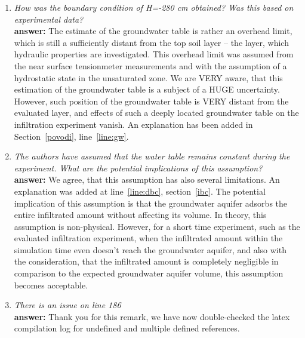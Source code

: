 \documentclass[final,3p, 11pt, a4paper]{elsarticle}
\begin{document}
\begin{enumerate}
\item {\it How was the boundary condition of H=-280 cm obtained? Was this based on experimental data?} \\
{\bf  answer:} The estimate of the groundwater table is rather an overhead limit, which is still a sufficiently distant from the top soil layer -- the layer, which hydraulic properties are investigated. This overhead limit was assumed from the near surface tensionmeter measurements and with the assumption of a hydrostatic state in the unsaturated zone. We are VERY aware, that this estimation of the groundwater table is a subject of a HUGE uncertainty. However, such position of the groundwater table is VERY distant from the evaluated layer, and effects of such a deeply located  groundwater table on the infiltration experiment vanish. An explanation has been added in Section~\ref{povodi}, line~\ref{line:gw}.
\item {\it   The authors have assumed that the water table remains constant during the experiment. What are the potential implications of this assumption?} \\
{\bf  answer:} We agree, that this assumption has also several limitations. An explanation was added at line~\ref{line:dbc}, section~\ref{ibc}. The potential implication of this assumption is that the groundwater aquifer adsorbs the entire infiltrated amount without affecting its volume. In theory, this assumption is non-physical. However, for a short time experiment, such as the evaluated infiltration experiment, when the infiltrated amount within the simulation time even doesn't reach the groundwater aquifer, and also with the consideration, that the infiltrated amount is completely negligible in comparison to the expected groundwater aquifer volume, this assumption becomes acceptable. 

\item {\it There is an issue on line 186} \\
{\bf  answer:} Thank you for this remark, we have now double-checked the latex compilation log for undefined and multiple defined references.


\end{enumerate}
\end{document}
